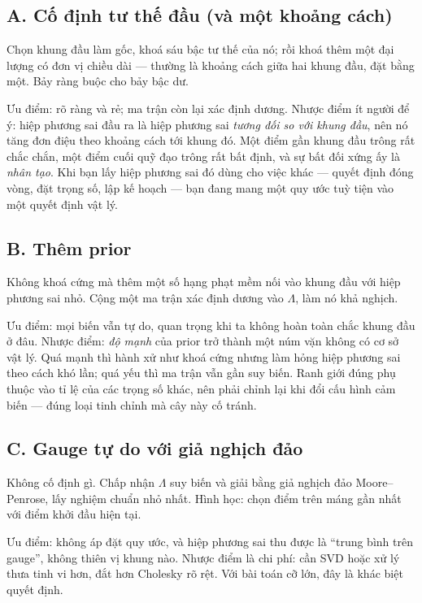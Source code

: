 \documentclass[../../vslam.tex]{subfiles}
\begin{document}
\subsection{A. Cố định tư thế đầu (và một khoảng cách)}

Chọn khung đầu làm gốc, khoá sáu bậc tư thế của nó; rồi khoá thêm một đại lượng có đơn vị chiều dài --- thường là khoảng cách giữa hai khung đầu, đặt bằng một. Bảy ràng buộc cho bảy bậc dư.

Ưu điểm: rõ ràng và rẻ; ma trận còn lại xác định dương. Nhược điểm ít người để ý: hiệp phương sai đầu ra là hiệp phương sai \emph{tương đối so với khung đầu}, nên nó tăng đơn điệu theo khoảng cách tới khung đó. Một điểm gần khung đầu trông rất chắc chắn, một điểm cuối quỹ đạo trông rất bất định, và sự bất đối xứng ấy là \emph{nhân tạo}. Khi bạn lấy hiệp phương sai đó dùng cho việc khác --- quyết định đóng vòng, đặt trọng số, lập kế hoạch --- bạn đang mang một quy ước tuỳ tiện vào một quyết định vật lý.

\subsection{B. Thêm prior}

Không khoá cứng mà thêm một số hạng phạt mềm nối vào khung đầu với hiệp phương sai nhỏ. Cộng một ma trận xác định dương vào \(\Lambda\), làm nó khả nghịch.

Ưu điểm: mọi biến vẫn tự do, quan trọng khi ta không hoàn toàn chắc khung đầu ở đâu. Nhược điểm: \emph{độ mạnh} của prior trở thành một núm vặn không có cơ sở vật lý. Quá mạnh thì hành xử như khoá cứng nhưng làm hỏng hiệp phương sai theo cách khó lần; quá yếu thì ma trận vẫn gần suy biến. Ranh giới đúng phụ thuộc vào tỉ lệ của các trọng số khác, nên phải chỉnh lại khi đổi cấu hình cảm biến --- đúng loại tinh chỉnh mà cây này cố tránh.

\subsection{C. Gauge tự do với giả nghịch đảo}

Không cố định gì. Chấp nhận \(\Lambda\) suy biến và giải bằng giả nghịch đảo Moore--Penrose, lấy nghiệm chuẩn nhỏ nhất. Hình học: chọn điểm trên máng gần nhất với điểm khởi đầu hiện tại.

Ưu điểm: không áp đặt quy ước, và hiệp phương sai thu được là ``trung bình trên gauge'', không thiên vị khung nào. Nhược điểm là chi phí: cần SVD hoặc xử lý thưa tinh vi hơn, đắt hơn Cholesky rõ rệt. Với bài toán cỡ lớn, đây là khác biệt quyết định.
\end{document}
